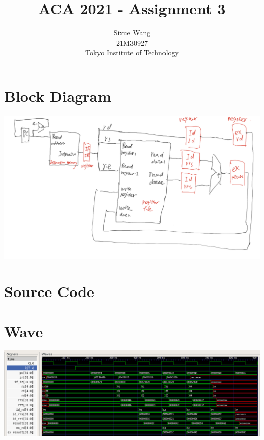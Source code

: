 \documentclass{article}
\title{ACA 2021 - Assignment 3}
\author{Sixue Wang\\21M30927\\Tokyo Institute of Technology}
\begin{document}
\maketitle

\section*{Block Diagram}
\includegraphics[width=\textwidth]{pipeline_diagram}

\section*{Source Code}


\section*{Wave}
\includegraphics[width=\textwidth]{pipeline_wave}
\end{document}
